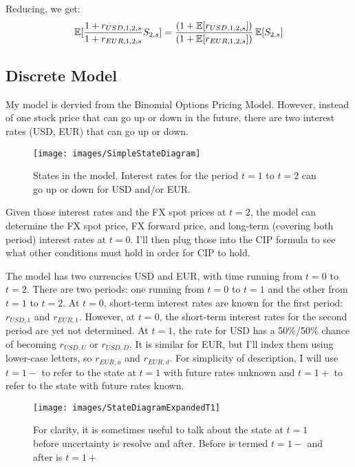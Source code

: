 Reducing, we get:
\begin{equation}
  \operatorname{\mathbb{E}}[\frac{1+r_{USD,1,2,s}}{1 + r_{EUR,1,2,s}} S_{2,s}] = \frac{(1 +\operatorname{\mathbb{E}}[r_{USD,1,2,s}])}{(1 +\operatorname{\mathbb{E}}[r_{EUR,1,2,s}])} \operatorname{\mathbb{E}}[S_{2,s}]
\end{equation}






\subsection{Discrete Model}


My model is dervied from the Binomial Options Pricing Model\cite{Cox1979}.  However, instead of one stock price that can go up or down in the future, there are two interest rates (USD, EUR) that can go up or down.  


\begin{figure}[H]  %
\texttt{[image: images/SimpleStateDiagram]}
\caption{States in the model.  Interest rates for the period $t=1$ to $t=2$ can go up or down for USD and/or  EUR.}
\label{SimpleStateDiagram}
\end{figure}

Given those interest rates and the FX spot prices at $t=2$, the model can determine the FX spot price, FX forward price, and long-term (covering both period) interest rates at $t=0$.  I'll then plug those into the CIP formula to see what other conditions must hold in order for CIP to hold.  

The model has two currencies USD and EUR, with time running from $t=0$ to $t=2$.  There are two periods: one running from $t=0$ to $t=1$ and the other from $t=1$ to $t=2$.  At $t=0$, short-term interest rates are known for the first period: $r_{USD,1}$ and $r_{EUR,1}$.  However, at $t=0$, the short-term interest rates for the second period are yet not determined.  At $t=1$, the rate for USD has a 50\%/50\% chance of becoming $r_{USD,U}$ or $r_{USD,D}$.  It is similar for EUR, but I'll index them using lower-case letters, so $r_{EUR,u}$ and $r_{EUR,d}$.  For simplicity of description, I will use $t=1-$ to refer to the state at $t=1$ with future rates unknown and $t=1+$ to refer to the state with future rates known.

\begin{figure}[H]  %
\texttt{[image: images/StateDiagramExpandedT1]}
\caption{For clarity, it is sometimes useful to talk about the state at $t=1$ before uncertainty is resolve and after.  Before is termed $t=1-$ and after is $t=1+$}
\label{StateDiagramExpandedT1}
\end{figure}

